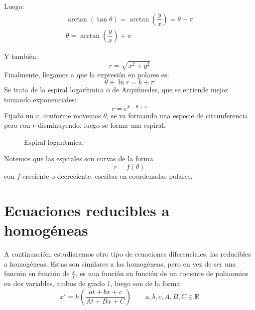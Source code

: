 \begin{ejemplo}
Luego:
\begin{gather*}
    \arctan(\tan \theta) = \arctan\left(\dfrac{y}{x}\right) = \theta - \pi \\
    \theta = \arctan\left(\dfrac{y}{x}\right) + \pi
\end{gather*}

Y también:
\begin{equation*}
    r = \sqrt{x^2 + y ^2}
\end{equation*}
Finalmente, llegamos a que la expresión en polares es:
\begin{equation*}
    \theta + \ln r = k + \pi
\end{equation*}
Se trata de la espiral logarítmica o de Arquímedes, que se entiende mejor tomando exponenciales:
\begin{equation*}
    r = e^{k-\theta+\pi}
\end{equation*}
Fijado un $r$, conforme movemos $\theta$, se va formando una especie de circunferencia pero con $r$ disminuyendo, luego se forma una espiral.
\begin{figure}[H]
\centering
{}
\caption{Espiral logarítmica.}
\end{figure}
\end{ejemplo}

\begin{observacion}
Notemos que las espirales son curvas de la forma
\begin{equation*}
    r = f(\theta)
\end{equation*}
con $f$ creciente o decreciente, escritas en coordenadas polares.
\end{observacion}

\section{Ecuaciones reducibles a homogéneas}
A continuación, estudiaremos otro tipo de ecuaciones diferenciales, las reducibles a homogéneas. Estas son similares a las homogéneas, pero en vez de ser una función en función de $\frac{x}{t}$, es una función en función de un cociente de polinomios en dos variables, ambos de grado 1, luego son de la forma:
\begin{equation*}
    x' = h\left(\dfrac{at + bx + c}{At + Bx + C}\right) \qquad a,b,c,A,B,C \in \mathbb{R}
\end{equation*}

